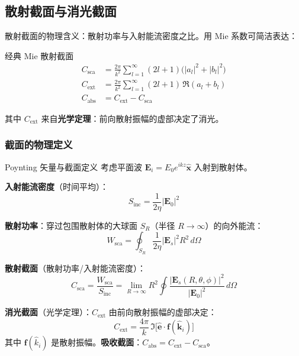 \subsection{散射截面与消光截面}

散射截面的物理含义：散射功率与入射能流密度之比。用 Mie 系数可简洁表达：

\begin{stepbox}{经典 Mie 散射截面}
\begin{align}
  C_{\text{sca}} &= \frac{2\pi}{k^2}\sum_{l=1}^\infty (2l+1)\bigl(|a_l|^2 + |b_l|^2\bigr) \label{eq:mie_Csca}\\[0.3em]
  C_{\text{ext}} &= \frac{2\pi}{k^2}\sum_{l=1}^\infty (2l+1)\,\Re(a_l + b_l) \label{eq:mie_Cext}\\[0.3em]
  C_{\text{abs}} &= C_{\text{ext}} - C_{\text{sca}} \label{eq:mie_Cabs}
\end{align}

其中 $C_{\text{ext}}$ 来自\textbf{光学定理}：前向散射振幅的虚部决定了消光。
\end{stepbox}

\subsubsection{截面的物理定义}

\begin{stepbox}{Poynting 矢量与截面定义}
考虑平面波 $\mathbf{E}_i = E_0 e^{ikz}\hat{\mathbf{x}}$ 入射到散射体。

\textbf{入射能流密度}（时间平均）：
\begin{equation}
  S_{\text{inc}} = \frac{1}{2\eta}|\mathbf{E}_0|^2
\end{equation}

\textbf{散射功率}：穿过包围散射体的大球面 $S_R$（半径 $R\to\infty$）的向外能流：
\begin{equation}
  W_{\text{sca}} = \oint_{S_R} \frac{1}{2\eta}|\mathbf{E}_s|^2 R^2\,d\Omega
\end{equation}

\textbf{散射截面}（散射功率/入射能流密度）：
\begin{equation}
  \boxed{\;C_{\text{sca}} = \frac{W_{\text{sca}}}{S_{\text{inc}}}
  = \lim_{R\to\infty}R^2\oint\frac{|\mathbf{E}_s(R,\theta,\phi)|^2}{|\mathbf{E}_0|^2}\,d\Omega\;}
  \label{eq:Csca_def}
\end{equation}

\textbf{消光截面}（光学定理）：$C_{\text{ext}}$ 由前向散射振幅的虚部决定：
\begin{equation}
  C_{\text{ext}} = \frac{4\pi}{k}\,\Im\bigl[\hat{\mathbf{e}}\cdot\mathbf{f}(\hat{\mathbf{k}}_i)\bigr]
  \label{eq:optical_theorem}
\end{equation}
其中 $\mathbf{f}(\hat{k}_i)$ 是散射振幅。\textbf{吸收截面}：$C_{\text{abs}} = C_{\text{ext}} - C_{\text{sca}}$。
\end{stepbox}

